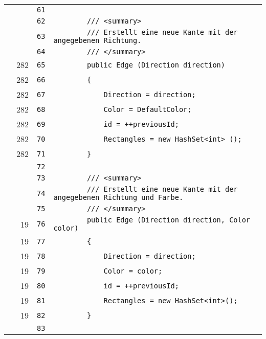 \documentclass[a4paper,10pt]{article}
\begin{document}
\begin{longtable}[l]{lrrl}
\cellcolor{gray} &  & \verb~61~ & \verb~~\\
\cellcolor{gray} &  & \verb~62~ & \verb~        /// <summary>~\\
\cellcolor{gray} &  & \verb~63~ & \verb~        /// Erstellt eine neue Kante mit der angegebenen Richtung.~\\
\cellcolor{gray} &  & \verb~64~ & \verb~        /// </summary>~\\
\cellcolor{green} & 282 & \verb~65~ & \verb~        public Edge (Direction direction)~\\
\cellcolor{green} & 282 & \verb~66~ & \verb~        {~\\
\cellcolor{green} & 282 & \verb~67~ & \verb~            Direction = direction;~\\
\cellcolor{green} & 282 & \verb~68~ & \verb~            Color = DefaultColor;~\\
\cellcolor{green} & 282 & \verb~69~ & \verb~            id = ++previousId;~\\
\cellcolor{green} & 282 & \verb~70~ & \verb~            Rectangles = new HashSet<int> ();~\\
\cellcolor{green} & 282 & \verb~71~ & \verb~        }~\\
\cellcolor{gray} &  & \verb~72~ & \verb~~\\
\cellcolor{gray} &  & \verb~73~ & \verb~        /// <summary>~\\
\cellcolor{gray} &  & \verb~74~ & \verb~        /// Erstellt eine neue Kante mit der angegebenen Richtung und Farbe.~\\
\cellcolor{gray} &  & \verb~75~ & \verb~        /// </summary>~\\
\cellcolor{green} & 19 & \verb~76~ & \verb~        public Edge (Direction direction, Color color)~\\
\cellcolor{green} & 19 & \verb~77~ & \verb~        {~\\
\cellcolor{green} & 19 & \verb~78~ & \verb~            Direction = direction;~\\
\cellcolor{green} & 19 & \verb~79~ & \verb~            Color = color;~\\
\cellcolor{green} & 19 & \verb~80~ & \verb~            id = ++previousId;~\\
\cellcolor{green} & 19 & \verb~81~ & \verb~            Rectangles = new HashSet<int>();~\\
\cellcolor{green} & 19 & \verb~82~ & \verb~        }~\\
\cellcolor{gray} &  & \verb~83~ & \verb~~\\

\end{longtable}
\end{document}

